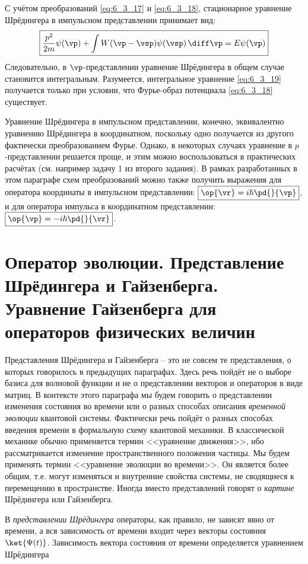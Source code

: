 С учётом преобразований \eqref{eq:6_3_17} и \eqref{eq:6_3_18}, стационарное уравнение Шрёдингера в импульсном представлении принимает вид:
\begin{equation}
\label{eq:6_3_19}
	\boxed{\frac{p^2}{2m} \psi(\vp) + \int W(\vp - \vsp) \psi(\vsp) \, \diff\vp  = E\psi(\vp)}
\end{equation}%
%
Следовательно, в $\vp$-представлении уравнение Шрёдингера в общем случае становится интегральным. Разумеется, интегральное уравнение \eqref{eq:6_3_19} получается только при условии, что Фурье-образ потенциала \eqref{eq:6_3_18} существует.

Уравнение Шрёдингера в импульсном представлении, конечно, эквивалентно уравнению Шрёдингера в координатном, поскольку одно получается из другого фактически преобразованием Фурье. Однако, в некоторых случаях уравнение в $p$-представлении решается проще, и этим можно воспользоваться в практических расчётах (см. например задачу 1 из второго задания). В рамках разработанных в этом параграфе схем преобразований можно также получить выражения для оператора координаты в импульсном представлении: $\boxed{\op{\vr} = i\hbar \pd{}{\vp}}$, и для оператора импульса в координатном представлении: $\boxed{\op{\vp} = -i\hbar \pd{}{\vr}}$.

\section{Оператор эволюции. Представление Шрёдингера и Гайзенберга. Уравнение Гайзенберга для операторов физических величин}

Представления Шрёдингера и Гайзенберга -- это не совсем те представления, о которых говорилось в предыдущих параграфах. Здесь речь пойдёт не о выборе базиса для волновой функции и не о представлении векторов и операторов в виде матриц. В контексте этого параграфа мы будем говорить о представлении изменения состояния во времени или о разных способах описания {\em временной эволюции} квантовой системы. Фактически речь пойдёт о разных способах введения времени в формальную схему квантовой механики. В классической механике обычно применяется термин <<уравнение движения>>, ибо рассматривается изменение пространственного положения частицы. Мы будем применять термин <<уравнение эволюции во времени>>. Он является более общим, т.е. могут изменяться и внутренние свойства системы, не сводящиеся к перемещению в пространстве. Иногда вместо представлений говорят о {\em картине} Шрёдингера или Гайзенберга.

В {\em представлении Шрёдингера} операторы, как правило, не зависят явно от времени, а вся зависимость от времени входит через векторы состояния $\ket{\Psi(t)}$. Зависимость вектора состояния от времени определяется уравнением Шрёдингера

